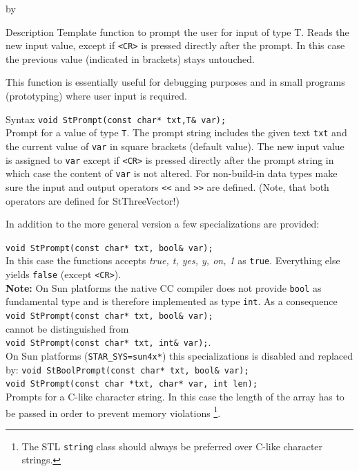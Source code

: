 \documentclass[twoside]{article}
\newcommand{\comp}[1]{\texttt{#1}}%
\newcommand{\entrylabel}[1]{\mbox{\textbf{{#1}}}\hfil}%
\newenvironment{entry}
{\begin{list}{}%
    {\renewcommand{\makelabel}{\entrylabel}%
     \setlength{\labelwidth}{90pt}%
     \setlength{\leftmargin}{\labelwidth}
     \advance\leftmargin by \labelsep%
      }%
    }%
  {\end{list}}
\newcommand{\Entrylabel}[1]%
{\raisebox{0pt}[1ex][0pt]{\makebox[\labelwidth][l]%
    {\parbox[t]{\labelwidth}{\hspace{0pt}\textbf{{#1}}}}}}
\newenvironment{Entry}%
{\renewcommand{\entrylabel}{\Entrylabel}\begin{entry}}%
  {\end{entry}}
\begin{document}
\begin{description}
\begin{Entry}
  
\item[Description]   
  Template function to prompt the user for input of type T.
  Reads the new input value, except if \verb+<CR>+ is 
  pressed directly after the prompt. In this case the
  previous value (indicated in brackets) stays untouched.

  This function is essentially useful for debugging purposes and in small
  programs (prototyping) where user input is required.
  
\item[Syntax]
    \verb+void StPrompt(const char* txt,T& var);+\\
    Prompt for a value of type \comp{T}. The prompt string includes
    the given text \comp{txt} and the current value of \comp{var}
    in square brackets (default value). The new input value is assigned
    to \comp{var} except if \verb+<CR>+ is pressed directly after the prompt
    string in which case the content of \comp{var} is not altered.
    For non-build-in data types make sure the input and output 
    operators \verb+<<+ and \verb+>>+ are defined. (Note, that 
    both operators are defined for StThreeVector!)

    In addition to the more general version a few specializations
    are provided:

    \verb+void StPrompt(const char* txt, bool& var);+\\
    In this case the functions accepts \textit{true, t, yes, y, on, 1}
    as \comp{true}. Everything else yields \comp{false}
    (except \verb+<CR>+).\\
    {\bf Note:} On Sun platforms the native CC compiler does not provide \comp{bool}
    as fundamental type and is therefore implemented as type \comp{int}.
    As a consequence \\
    \verb+void StPrompt(const char* txt, bool& var);+\\
    cannot be distinguished from \\
    \verb+void StPrompt(const char* txt, int& var);+.\\
    On Sun platforms (\comp{STAR\_SYS=sun4x*}) this specializations is
    disabled and replaced by:
    \verb+void StBoolPrompt(const char* txt, bool& var);+\\    

    \verb+void StPrompt(const char *txt, char* var, int len);+\\
    Prompts for a C-like character string. In this case the length
    of the array has to be passed in order to prevent memory violations
    \footnote{The STL \comp{string} class should always be preferred
        over C-like character strings.}.
    

\end{Entry}
\end{description}
\end{document}
